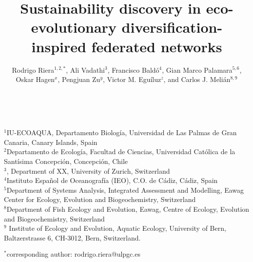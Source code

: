 \documentclass[12pt,a4paper]{article}
\begin{document}
\title{Sustainability discovery in eco-evolutionary diversification-inspired federated networks}%

\maketitle
\noindent \author{Rodrigo Riera$^{1,2,*}$, Ali Vadathi$^{3}$, Francisco Bald\'o$^{4}$, Gian Marco Palamara$^{5,6}$, Oskar Hagen$^{x}$, Pengjuan Zu$^{y}$, Victor M. Egu\'iluz$^{z}$, and Carlos J. Meli\'an$^{8,9}$}
            \\
            
            \vspace{0.25 in}
            
  \noindent  $^{1}$IU-ECOAQUA, Departamento Biolog\'ia, Universidad de Las Palmas de Gran Canaria, Canary Islands, Spain\\
  $^{2}$Departamento de Ecolog\'ia, Facultad de Ciencias, Universidad Cat\'olica de la Sant\'isima Concepci\'on, Concepci\'on, Chile\\
  $^{3}$, Department of XX, University of Zurich, Switzerland\\
  $^{4}$Instituto Español de Oceanografía (IEO), C.O. de Cádiz, Cádiz, Spain\\
  $^{5}$Department of Systems Analysis, Integrated Assessment and Modelling, Eawag Center for Ecology, Evolution and Biogeochemistry, Switzerland\\
  $^{8}$Department of Fish Ecology and Evolution, Eawag, Centre of Ecology, Evolution and Biogeochemistry, Switzerland\\
  $^{9}$ Institute of Ecology and Evolution, Aquatic Ecology, University of Bern, Baltzerstrasse 6, CH-3012, Bern, Switzerland.\\
\vspace{0.25 in}

  $^{*}$corresponding author: rodrigo.riera@ulpgc.es
\end{document}
